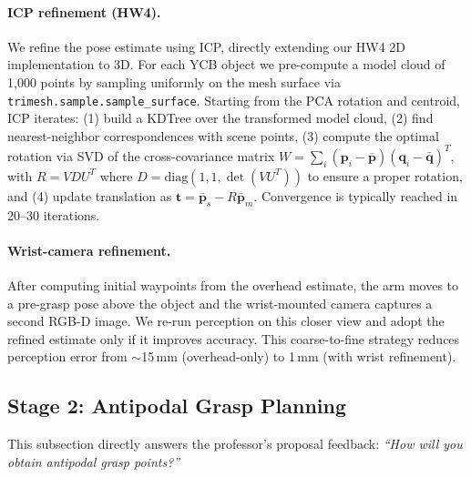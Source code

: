 \documentclass[11pt]{article}
\begin{document}
\paragraph{ICP refinement (HW4).}
We refine the pose estimate using ICP, directly extending our HW4 2D
implementation to 3D. For each YCB object we pre-compute a model cloud
of 1{,}000 points by sampling uniformly on the mesh surface via
\texttt{trimesh.sample.sample\_surface}. Starting from the PCA rotation
and centroid, ICP iterates: (1) build a KDTree over the transformed model
cloud, (2) find nearest-neighbor correspondences with scene points,
(3) compute the optimal rotation via SVD of the cross-covariance matrix
$W = \sum_i (\mathbf{p}_i - \bar{\mathbf{p}}) (\mathbf{q}_i -
\bar{\mathbf{q}})^T$, with $R = V D U^T$ where $D = \mathrm{diag}(1, 1,
\det(VU^T))$ to ensure a proper rotation, and (4) update translation as
$\mathbf{t} = \bar{\mathbf{p}}_s - R \bar{\mathbf{p}}_m$. Convergence is
typically reached in 20--30 iterations.

\paragraph{Wrist-camera refinement.}
After computing initial waypoints from the overhead estimate, the arm
moves to a pre-grasp pose above the object and the wrist-mounted camera
captures a second RGB-D image. We re-run perception on this closer view
and adopt the refined estimate only if it improves accuracy. This
coarse-to-fine strategy reduces perception error from $\sim$15\,mm
(overhead-only) to 1\,mm (with wrist refinement).

\subsection{Stage 2: Antipodal Grasp Planning}

This subsection directly answers the professor's proposal feedback:
\emph{``How will you obtain antipodal grasp points?''}
\end{document}
